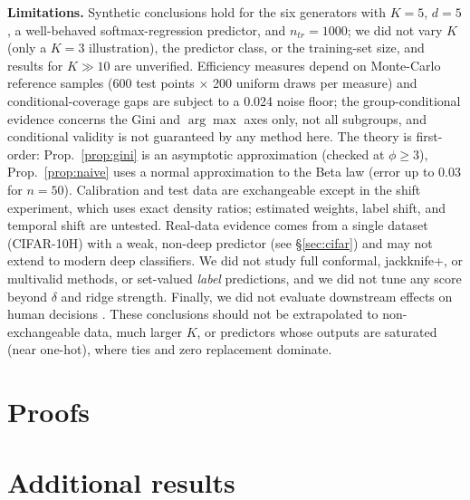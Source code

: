 \documentclass{article}
\begin{document}
\textbf{Limitations.} Synthetic conclusions hold for the six generators with $K=5$, $d=5$, a well-behaved softmax-regression predictor, and $n_{tr}=1000$; we did not vary $K$ (only a $K=3$ illustration), the predictor class, or the training-set size, and results for $K\gg10$ are unverified. Efficiency measures depend on Monte-Carlo reference samples (600 test points $\times$ 200 uniform draws per measure) and conditional-coverage gaps are subject to a 0.024 noise floor; the group-conditional evidence concerns the Gini and $\arg\max$ axes only, not all subgroups, and conditional validity is not guaranteed by any method here. The theory is first-order: Prop.~\ref{prop:gini} is an asymptotic approximation (checked at $\phi\ge3$), Prop.~\ref{prop:naive} uses a normal approximation to the Beta law (error up to 0.03 for $n=50$). Calibration and test data are exchangeable except in the shift experiment, which uses exact density ratios; estimated weights, label shift, and temporal shift are untested. Real-data evidence comes from a single dataset (CIFAR-10H) with a weak, non-deep predictor (see \S\ref{sec:cifar}) and may not extend to modern deep classifiers. We did not study full conformal, jackknife+, or multivalid methods, or set-valued \emph{label} predictions, and we did not tune any score beyond $\delta$ and ridge strength. Finally, we did not evaluate downstream effects on human decisions \citep{cresswell2024conformal}. These conclusions should not be extrapolated to non-exchangeable data, much larger $K$, or predictors whose outputs are saturated (near one-hot), where ties and zero replacement dominate.




\appendix
\section{Proofs}\label{app:proofs}

\section{Additional results}\label{app:theory}

\end{document}
